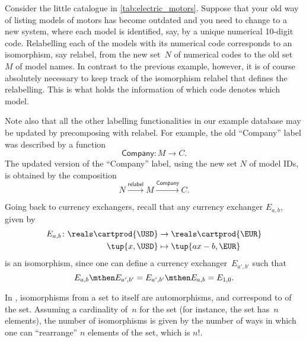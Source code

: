 \begin{example}[Relabelling]
Consider the little catalogue in \cref{tab:electric_motors}.
Suppose that your old way of listing models of motors has become outdated and you need to change to a new system, where each model is identified, say, by a unique numerical 10-digit code.
Relabelling each of the models with its numerical code corresponds to an isomorphism, say \textsf{relabel}, from the new set~$N$ of numerical codes to the old set~$M$ of model names.
In contrast to the previous example, however, it is of course absolutely necessary to keep track of the isomorphism \textsf{relabel} that defines the relabelling.
This is what holds the information of which code denotes which model.

Note also that all the other labelling functionalities in our example database may be updated by precomposing with \textsf{relabel}.
For example, the old ``Company'' label was described by a function
\begin{equation*}
\textsf{Company}\colon M \to C.
\end{equation*}
The updated version of the ``Company'' label, using the new set $N$ of model IDs, is obtained by the composition
\begin{equation*}
N \overset{\textsf{relabel}}{\longrightarrow} M \overset{\textsf{Company}}{\longrightarrow} C.
\end{equation*}
\end{example}

\begin{example}
Going back to currency exchangers, recall that any currency exchanger $E_{a,b}$, given by
\begin{equation*}
\begin{aligned}
E_{a,b}\colon \reals\cartprod \{\USD\}&\to \reals\cartprod \{\EUR\}\\
\tup{x,\USD}&\mapsto \tup{ax-b,\EUR}
\end{aligned}
\end{equation*}
is an isomorphism, since one can define a currency exchanger~$E_{a',b'}$ such that
\begin{equation*}
E_{a,b}\mthen E_{a',b'}=E_{a',b'}\mthen E_{a,b}=E_{1,0}.
\end{equation*}
\end{example}


\begin{example}
In \FinSet, isomorphisms from a set to itself are automorphisms, and correspond to \emph{} of the set.
Assuming a cardinality of~$n$ for the set (for instance, the set has~$n$ elements), the number of isomorphisms is given by the number of ways in which one can ``rearrange'' $n$ elements of the set, which is $n!$.
\end{example}

